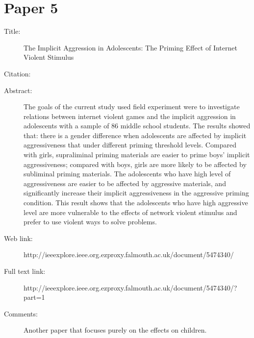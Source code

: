 \documentclass{scrartcl}
\begin{document}
\section*{Paper 5}
\begin{description}
\item[Title:] The Implicit Aggression in Adolescents: The Priming Effect of Internet Violent Stimulus
\item[Citation:] \cite{bibtex_key}
\item[Abstract:] The goals of the current study used field experiment were to investigate relations between internet violent games and the implicit aggression in adolescents with a sample of 86 middle school students. The results showed that: there is a gender difference when adolescents are affected by implicit aggressiveness that under different priming threshold levels. Compared with girls, supraliminal priming materials are easier to prime boys’ implicit aggressiveness; compared with boys, girls are more likely to be affected by subliminal priming materials. The adolescents who have high level of aggressiveness are easier to be affected by aggressive materials, and significantly increase their implicit aggressiveness in the aggressive priming condition. This result shows that the adolescents who have high aggressive level are more vulnerable to the effects of network violent stimulus and prefer to use violent ways to solve problems.
\item[Web link:] http://ieeexplore.ieee.org.ezproxy.falmouth.ac.uk/document/5474340/
\item[Full text link:] http://ieeexplore.ieee.org.ezproxy.falmouth.ac.uk/document/5474340/?part=1
\item[Comments:] Another paper that focuses purely on the effects on children. 
\end{description}
\end{document}
